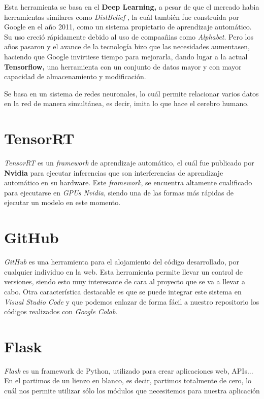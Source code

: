 Esta herramienta se basa en el \textbf{Deep Learning,} a pesar de que el mercado habia herramientas similares como \textit{DistBelief} \cite{distBelief}, la cuál también fue construida por Google en el año 2011, como un sistema propietario de aprendizaje automático. Su uso creció rápidamente debido al uso de compaañias como \textit{Alphabet}. Pero los años pasaron y el avance de la tecnología 
hizo que las necesidades aumentasen, haciendo que Google invirtiese tiempo para mejorarla, dando lugar a la actual \textbf{Tensorflow,} una herramienta con un conjunto de datos mayor y con mayor capacidad de almacenamiento y modificación.

Se basa en un sistema de redes neuronales, lo cuál permite relacionar varios datos en la red de manera simultánea, es decir, imita lo que hace el cerebro humano.

\section{TensorRT}
\textit{TensorRT} \cite{tensorrt} es un \textit{framework} de aprendizaje automático, el cuál fue publicado por \textbf{Nvidia} para ejecutar inferencias que son interferencias de aprendizaje automático en su hardware. Este \textit{framework}, se encuentra altamente cualificado para ejecutarse en \textit{GPUs Nvidia}, siendo una de las formas más rápidas de ejecutar un modelo en este momento.


\section{GitHub}
\textit{GitHub} \cite{github} es una herramienta para el alojamiento del código desarrollado, por cualquier individuo en la web. Esta herramienta permite llevar un control de versiones, siendo esto muy interesante de cara al proyecto que se va a llevar a cabo.
Otra característica destacable es que se puede integrar este sistema en \textit{Visual Studio Code} \cite{visualStudioCode} y que podemos enlazar de forma fácil a nuestro repositorio los códigos realizados con \textit{Google Colab}\cite{colab}.

\section{Flask}
\textit{Flask} \cite{flask} es un framework de Python, utilizado para crear aplicaciones web, APIs... En el partimos de un lienzo en blanco, es decir, partimos totalmente de cero, lo cuál nos permite utilizar sólo los módulos que necesitemos para nuestra aplicación


